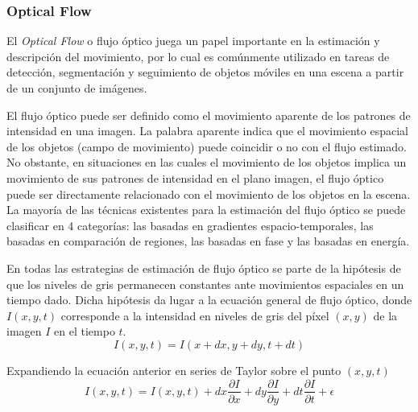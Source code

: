 \subsubsection{Optical Flow}
El \emph{Optical Flow} o flujo óptico juega un papel importante en la estimación y descripción del movimiento, por lo cual es comúnmente utilizado en tareas de detección, segmentación y seguimiento de objetos móviles en una escena a partir de un conjunto de imágenes. 

El flujo óptico puede ser definido como el movimiento aparente de los patrones de intensidad en una imagen. La palabra aparente indica que el movimiento espacial de los objetos (campo de movimiento) puede coincidir o no con el flujo estimado. No obstante, en situaciones en las cuales el movimiento de los objetos implica un movimiento de sus patrones de intensidad en el plano imagen, el flujo óptico puede ser directamente relacionado con el movimiento de los objetos en la escena. La mayoría de las técnicas existentes para la estimación del flujo óptico se puede clasificar en 4 categorías: las basadas en gradientes espacio-temporales, las basadas en comparación de regiones, las basadas en fase y las basadas en energía.

En todas las estrategias de estimación de flujo óptico se parte de la hipótesis de que los niveles de gris permanecen constantes ante movimientos espaciales en un tiempo dado. Dicha hipótesis da lugar a la ecuación general de flujo óptico, donde $I(x, y, t)$ corresponde a la intensidad en niveles de gris del píxel $(x,y)$ de la imagen $I$ en el tiempo $t$. 
\begin{equation}
  I(x,y,t) = I(x+dx,y+dy,t+dt)
\end{equation}

Expandiendo la ecuación anterior en series de Taylor sobre el punto $(x,y,t)$
\begin{equation}
  I(x,y,t) = I(x,y,t) + dx \frac{\partial I}{\partial x}+dy\frac{\partial I}{\partial y} + dt \frac{\partial I}{\partial t} + \epsilon
\end{equation}

